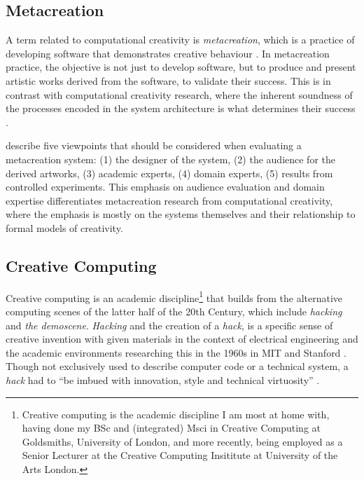 \subsection{Metacreation}

A term related to computational creativity is \textit{metacreation}, which is a practice of developing software that demonstrates creative behaviour \citep{whitelaw2004metacreation}. 
In metacreation practice, the objective is not just to develop software, but to produce and present artistic works derived from the software, to validate their success. 
This is in contrast with computational creativity research, where the inherent soundness of the processes encoded in the system architecture is what determines their success \citep{colton2008creativity}.

\cite{eigenfeldt2012evaluating} describe five viewpoints that should be considered when evaluating a metacreation system: (1) the designer of the system, (2) the audience for the derived artworks, (3) academic experts, (4) domain experts, (5) results from controlled experiments.  
This emphasis on audience evaluation and domain expertise differentiates metacreation research from computational creativity, where the emphasis is mostly on the systems themselves and their relationship to formal models of creativity.

\subsection{Creative Computing}

Creative computing is an academic discipline\footnote{Creative computing is the academic discipline I am most at home with, having done my BSc and (integrated) Msci in Creative Computing at Goldsmiths, University of London, and more recently, being employed as a Senior Lecturer at the Creative Computing Insititute at University of the Arts London.}
that builds from the alternative computing scenes of the latter half of the 20th Century, which include  \textit{hacking} and \textit{the demoscene}. 
\textit{Hacking} and the creation of a \textit{hack}, is a specific sense of creative invention with given materials in the context of electrical engineering and the academic environments researching this in the 1960s in MIT and Stanford \citep{wark2006hackers}. 
Though not exclusively used to describe computer code or a technical system, a \textit{hack} had to ``be imbued with innovation, style and technical virtuosity'' \citep{levy1984hackers}.


